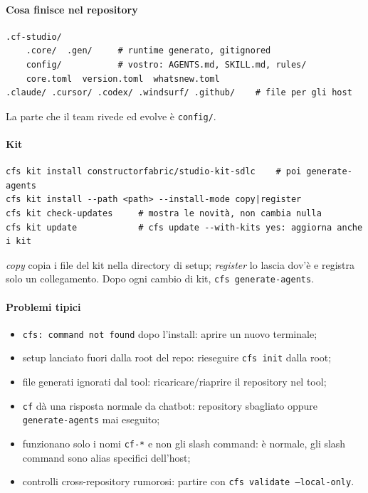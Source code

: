 \documentclass[a4paper,12pt]{article}
\begin{document}
\paragraph{Cosa finisce nel repository}
\begin{verbatim}
.cf-studio/
    .core/  .gen/     # runtime generato, gitignored
    config/           # vostro: AGENTS.md, SKILL.md, rules/
    core.toml  version.toml  whatsnew.toml
.claude/ .cursor/ .codex/ .windsurf/ .github/    # file per gli host
\end{verbatim}
La parte che il team rivede ed evolve è \texttt{config/}.

\paragraph{Kit}
\begin{verbatim}
cfs kit install constructorfabric/studio-kit-sdlc    # poi generate-agents
cfs kit install --path <path> --install-mode copy|register
cfs kit check-updates     # mostra le novità, non cambia nulla
cfs kit update            # cfs update --with-kits yes: aggiorna anche i kit
\end{verbatim}
\emph{copy} copia i file del kit nella directory di setup; \emph{register} lo lascia dov'è
e registra solo un collegamento. Dopo ogni cambio di kit, \texttt{cfs generate-agents}.

\paragraph{Problemi tipici}
\begin{itemize}
  \item \texttt{cfs: command not found} dopo l'install: aprire un nuovo terminale;
  \item setup lanciato fuori dalla root del repo: rieseguire \texttt{cfs init} dalla root;
  \item file generati ignorati dal tool: ricaricare/riaprire il repository nel tool;
  \item \texttt{cf} dà una risposta normale da chatbot: repository sbagliato oppure
        \texttt{generate-agents} mai eseguito;
  \item funzionano solo i nomi \texttt{cf-*} e non gli slash command: è normale, gli slash
        command sono alias specifici dell'host;
  \item controlli cross-repository rumorosi: partire con \texttt{cfs validate --local-only}.
\end{itemize}
\end{document}
